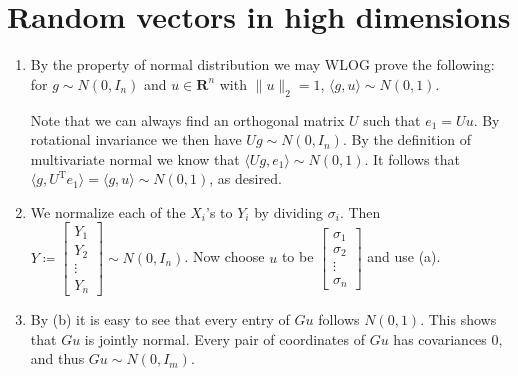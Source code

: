 \documentclass[11pt]{article}
\newcommand{\R}{\mathbf{R}}
\newcommand{\inp}[2]{\langle #1, #2 \rangle}
\newcommand{\nm}[1]{\lVert #1 \rVert}
\newcommand{\trp}{\mathrm T}
\theoremstyle{plain}
\theoremstyle{definition}
\theoremstyle{remark}
\theoremstyle{definition}
\newenvironment{mansol}[1]{%
  \renewcommand\themansolinner{#1}%
  \mansolinner
}{\endmansolinner}
\begin{document}
\section{Random vectors in high dimensions}
\begin{mansol}{3.3.3}
    \begin{enumerate}[label=(\alph*)]
        \item By the property of normal distribution we may WLOG prove the following: for $g \sim N(0,I_n)$ and $u \in \R^n$ with $\nm{u}_2 = 1$, $\inp{g}{u}\sim N(0,1)$.
        
        Note that we can always find an orthogonal matrix $U$ such that $e_1 = Uu$. By rotational invariance we then have $Ug \sim N(0,I_n)$. By the definition of multivariate normal we know that $\inp{Ug}{e_1} \sim N(0,1)$. It follows that $\inp{g}{U^\trp e_1} = \inp{g}{u} \sim N(0,1)$, as desired.
        \item We normalize each of the $X_i$'s to $Y_i$ by dividing $\sigma_i$. Then $Y \coloneqq 
        \begin{bmatrix}
            Y_1 \\ Y_2 \\ \vdots \\ Y_n
        \end{bmatrix} \sim N(0,I_n)$. Now choose $u$ to be $\begin{bmatrix}
            \sigma_1 \\ \sigma_2 \\ \vdots \\ \sigma_n
        \end{bmatrix}$ and use (a).
        \item By (b) it is easy to see that every entry of $Gu$ follows $N(0,1)$. This shows that $Gu$ is jointly normal. Every pair of coordinates of $Gu$ has covariances 0, and thus $Gu \sim N(0,I_m)$.
    \end{enumerate}
\end{mansol}
\end{document}
